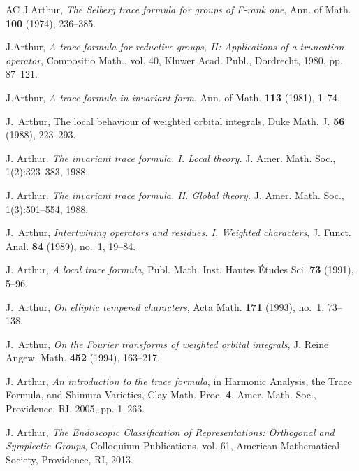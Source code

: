 \documentclass[11pt]{amsart}
\theoremstyle{definition}
\numberwithin{equation}{section}
\begin{document}
	
	
	
	
	\begin{thebibliography}{AC}
     J.Arthur, \textit{The Selberg trace formula for groups of F-rank one}, Ann. of Math. \textbf{100} (1974), 236--385.

     J.Arthur, \textit{A trace formula for reductive groups, II: Applications of a truncation operator}, Compositio Math., vol. 40, Kluwer Acad. Publ., Dordrecht, 1980, pp. 87--121.

     J.Arthur, \textit{A trace formula in invariant form}, Ann. of Math. \textbf{113} (1981), 1--74.

     J.~Arthur, The local behaviour of weighted orbital integrals, Duke Math. J. \textbf{56} (1988), 223--293.

     J. Arthur. \textit{The invariant trace formula. I. Local theory.} J. Amer. Math. Soc., 1(2):323–383,
		1988.
		
		
		 J. Arthur. \textit{The invariant trace formula. II. Global theory.} J. Amer. Math. Soc., 1(3):501–554,
		1988.

J.~Arthur,
\textit{Intertwining operators and residues. I. Weighted characters},
J. Funct. Anal. \textbf{84} (1989), no.~1, 19--84.

        J. Arthur,
\textit{A local trace formula},
Publ. Math. Inst. Hautes \'Etudes Sci. \textbf{73} (1991), 5--96.
		
		 J.~Arthur, \emph{On elliptic tempered characters}, Acta Math. \textbf{171} (1993), no.~1, 73--138.
		
		J.~Arthur, \textit{On the Fourier transforms of weighted orbital integrals},
		J. Reine Angew. Math. \textbf{452} (1994), 163--217.
		
		
		
		J. Arthur, \textit{An introduction to the trace formula}, in Harmonic Analysis, the Trace Formula, and Shimura Varieties, Clay Math. Proc. \textbf{4}, Amer. Math. Soc., Providence, RI, 2005, pp. 1--263.

         J. Arthur,
		\textit{The Endoscopic Classification of Representations: Orthogonal and Symplectic Groups},
		Colloquium Publications, vol. 61,
		American Mathematical Society, Providence, RI, 2013.


\end{thebibliography}
\end{document}

